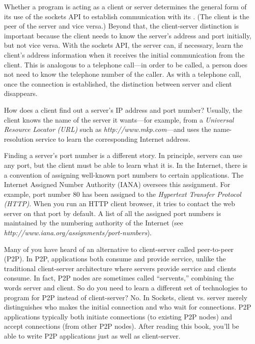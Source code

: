 Whether a program is acting as a client or server determines the
general form of its use of the sockets API to establish communication
with its .  (The client is the peer of the server and vice
versa.)  Beyond that, the client-server distinction is important
because {the client needs to know the server's address and port
initially}, but not vice versa.  With the sockets API, the server can,
if necessary, learn the client's address information when it receives
the initial communication from the client.  This is analogous to a
telephone call---in order to be called, a person does not need to know
the telephone number of the caller.  As with a telephone call, once
the connection is established, the distinction between server and
client disappears.

How does a client find out a server's IP address and port number?
Usually, the client knows the name of the server it wants---for
example, from a \emph{Universal Resource Locator (URL)} such as
\emph{http://www.mkp.com}---and uses the name-resolution service to
learn the corresponding Internet address.

Finding a server's port number is a different story.  In principle,
servers can use any port, but the client must be able to learn what it
is.  In the Internet, there is a convention of assigning {well-known
port numbers} to certain applications. The Internet Assigned Number
Authority (IANA) oversees this assignment.  For example, port number
80 has been assigned to the \emph{Hypertext Transfer Protocol}
\emph{(HTTP)}.  When you run an HTTP client browser, it tries to
contact the web server on that port by default. A list of all the
assigned port numbers is maintained by the numbering authority of the
Internet (see \emph{http://www.iana.org/assignments/port-numbers}).

Many of you have heard of an alternative to client-server called peer-to-peer
(P2P).  In P2P, applications both consume and provide service,
unlike the traditional client-server architecture where
servers provide service
and clients consume.  In fact, P2P nodes are sometimes called ``servents,'' combining
the words server and client.  So do you need to learn a different set of technologies to
program for P2P instead of client-server?  No.  In Sockets, client vs. server
merely distinguishes who makes the initial connection and who wait for connections.
P2P applications typically both initiate connections (to existing P2P nodes)
and accept connections (from other P2P nodes).  After reading this book, you'll
be able to write P2P applications just as well as client-server.

